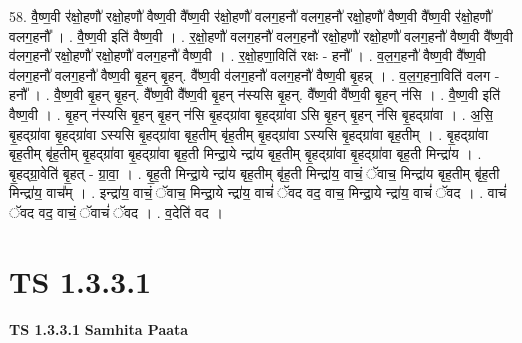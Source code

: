 \documentclass[17pt]{extarticle}
\begin{document}
58. वै॒ष्ण॒वी र॑क्षो॒हणौ॑ रक्षो॒हणौ॑ वैष्ण॒वी वै᳚ष्ण॒वी र॑क्षो॒हणौ॑ वलग॒हनौ॑ वलग॒हनौ॑ रक्षो॒हणौ॑ वैष्ण॒वी वै᳚ष्ण॒वी र॑क्षो॒हणौ॑ वलग॒हनौ᳚ । . वै॒ष्ण॒वी इति॑ वैष्ण॒वी । . र॒क्षो॒हणौ॑ वलग॒हनौ॑ वलग॒हनौ॑ रक्षो॒हणौ॑ रक्षो॒हणौ॑ वलग॒हनौ॑ वैष्ण॒वी वै᳚ष्ण॒वी व॑लग॒हनौ॑ रक्षो॒हणौ॑ रक्षो॒हणौ॑ वलग॒हनौ॑ वैष्ण॒वी । . र॒क्षो॒हणा॒विति॑ रक्षः - हनौ᳚ । . व॒ल॒ग॒हनौ॑ वैष्ण॒वी वै᳚ष्ण॒वी व॑लग॒हनौ॑ वलग॒हनौ॑ वैष्ण॒वी बृ॒हन् बृ॒हन्. वै᳚ष्ण॒वी व॑लग॒हनौ॑ वलग॒हनौ॑ वैष्ण॒वी बृ॒हन्न् । . व॒ल॒ग॒हना॒विति॑ वलग - हनौ᳚ । . वै॒ष्ण॒वी बृ॒हन् बृ॒हन्. वै᳚ष्ण॒वी वै᳚ष्ण॒वी बृ॒हन् न॑स्यसि बृ॒हन्. वै᳚ष्ण॒वी वै᳚ष्ण॒वी बृ॒हन् न॑सि । . वै॒ष्ण॒वी इति॑ वैष्ण॒वी । . बृ॒हन् न॑स्यसि बृ॒हन् बृ॒हन् न॑सि बृ॒हद्ग्रा॑वा बृ॒हद्ग्रा॑वा ऽसि बृ॒हन् बृ॒हन् न॑सि बृ॒हद्ग्रा॑वा । . अ॒सि॒ बृ॒हद्ग्रा॑वा बृ॒हद्ग्रा॑वा ऽस्यसि बृ॒हद्ग्रा॑वा बृह॒तीम् बृ॑ह॒तीम् बृ॒हद्ग्रा॑वा ऽस्यसि बृ॒हद्ग्रा॑वा बृह॒तीम् । . बृ॒हद्ग्रा॑वा बृह॒तीम् बृ॑ह॒तीम् बृ॒हद्ग्रा॑वा बृ॒हद्ग्रा॑वा बृह॒ती मिन्द्रा॒ये न्द्रा॑य बृह॒तीम् बृ॒हद्ग्रा॑वा बृ॒हद्ग्रा॑वा बृह॒ती मिन्द्रा॑य । . बृ॒हद्ग्रा॒वेति॑ बृ॒हत् - ग्रा॒वा॒ । . बृ॒ह॒ती मिन्द्रा॒ये न्द्रा॑य बृह॒तीम् बृ॑ह॒ती मिन्द्रा॑य॒ वाचं॒ ॅवाच॒ मिन्द्रा॑य बृह॒तीम् बृ॑ह॒ती मिन्द्रा॑य॒ वाच᳚म् । . इन्द्रा॑य॒ वाचं॒ ॅवाच॒ मिन्द्रा॒ये न्द्रा॑य॒ वाचं॑ ॅवद वद॒ वाच॒ मिन्द्रा॒ये न्द्रा॑य॒ वाचं॑ ॅवद । . वाचं॑ ॅवद वद॒ वाचं॒ ॅवाचं॑ ॅवद । . व॒देति॑ वद । \newline
\pagebreak
{}
\section*{ TS 1.3.3.1 }

\textbf{TS 1.3.3.1 } \newline
\textbf{Samhita Paata} \newline
\end{document}
